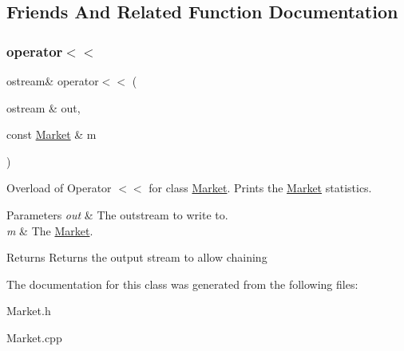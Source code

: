 \subsection{Friends And Related Function Documentation}
\hypertarget{class_market_a7011d607c3f984135fbc081b8909a1d6}{}\label{class_market_a7011d607c3f984135fbc081b8909a1d6} 
\subsubsection{\texorpdfstring{operator$<$$<$}{operator<<}}
{\footnotesize\ttfamily ostream\& operator$<$$<$ (\begin{DoxyParamCaption}\item[{ostream \&}]{out,  }\item[{const \hyperlink{class_market}{Market} \&}]{m }\end{DoxyParamCaption})\hspace{0.3cm}{\ttfamily [friend]}}

Overload of Operator $<$$<$ for class \hyperlink{class_market}{Market}. Prints the \hyperlink{class_market}{Market} statistics. 
\begin{DoxyParams}{Parameters}
{\em out} & The outstream to write to. \\
\hline
{\em m} & The \hyperlink{class_market}{Market}. \\
\hline
\end{DoxyParams}
\begin{DoxyReturn}{Returns}
Returns the output stream to allow chaining 
\end{DoxyReturn}


The documentation for this class was generated from the following files\+:\begin{DoxyCompactItemize}
\item 
Market.\+h\item 
Market.\+cpp\end{DoxyCompactItemize}
